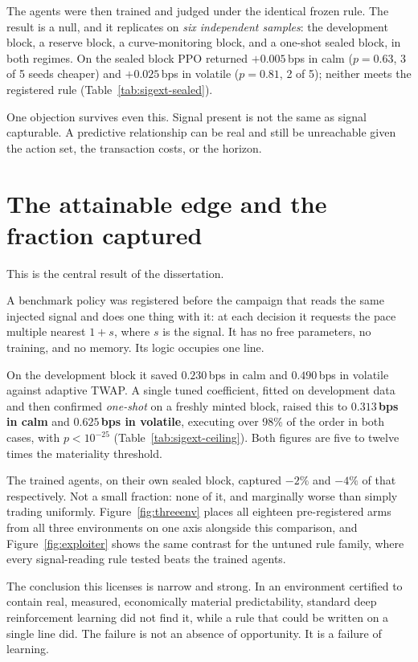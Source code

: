 The agents were then trained and judged under the identical frozen rule. The result is a
null, and it replicates on \emph{six independent samples}: the development block, a reserve
block, a curve-monitoring block, and a one-shot sealed block, in both regimes. On the sealed
block PPO returned $+0.005$\,bps in calm ($p = 0.63$, 3 of 5 seeds cheaper) and
$+0.025$\,bps in volatile ($p = 0.81$, 2 of 5); neither meets the registered rule
(Table~\ref{tab:sigext-sealed}).

One objection survives even this. Signal present is not the same as signal capturable. A
predictive relationship can be real and still be unreachable given the action set, the
transaction costs, or the horizon.

\section{The attainable edge and the fraction captured}\label{sec:res-ceiling}

This is the central result of the dissertation.

A benchmark policy was registered before the campaign that reads the same injected signal
and does one thing with it: at each decision it requests the pace multiple nearest
$1 + s$, where $s$ is the signal. It has no free parameters, no training, and no memory.
Its logic occupies one line.

On the development block it saved $0.230$\,bps in calm and $0.490$\,bps in volatile against
adaptive TWAP. A single tuned coefficient, fitted on development data and then confirmed
\emph{one-shot} on a freshly minted block, raised this to $\mathbf{0.313}$\,\textbf{bps in
calm} and $\mathbf{0.625}$\,\textbf{bps in volatile}, executing over 98\% of the order in
both cases, with $p < 10^{-25}$ (Table~\ref{tab:sigext-ceiling}). Both figures are five to twelve times
the materiality threshold.

The trained agents, on their own sealed block, captured $-2\%$ and $-4\%$ of that
respectively. Not a small fraction: none of it, and marginally worse than simply trading
uniformly. Figure~\ref{fig:threeenv} places all eighteen pre-registered arms from all three
environments on one axis alongside this comparison, and Figure~\ref{fig:exploiter} shows the
same contrast for the untuned rule family, where every signal-reading rule tested beats the
trained agents.

The conclusion this licenses is narrow and strong. In an environment certified to contain
real, measured, economically material predictability, standard deep reinforcement learning
did not find it, while a rule that could be written on a single line did. The failure is not
an absence of opportunity. It is a failure of learning.

